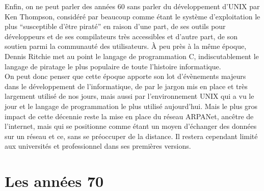 \documentclass[a4paper]{memoir}
\begin{document}
Enfin, on ne peut parler des années 60 sans parler du développement d'UNIX par Ken Thompson, considéré par beaucoup comme étant le système d'exploitation le plus ``susceptible d'être piraté'' en raison d'une part, de ses outils pour développeurs et de ses compilateurs très accessibles et d'autre part, de son soutien parmi la communauté des utilisateurs. À peu près à la même époque, Dennis Ritchie met au point le langage de programmation C, indiscutablement le langage de piratage le plus populaire de toute l'histoire informatique.\\

On peut donc penser que cette époque apporte son lot d'évènements majeurs dans le développement de l'informatique, de par le jargon mis en place et très largement utilisé de nos jours, mais aussi par l'environnement UNIX qui a vu le jour et le langage de programmation le plus utilisé aujourd'hui. Mais le plus gros impact de cette décennie reste la mise en place du réseau ARPANet, ancêtre de l'internet, mais qui se positionne comme étant un moyen d'échanger des données sur un réseau et ce, sans se préoccuper de la distance. Il restera cependant limité aux universités et professionnel dans ses premières versions.

\section{Les années 70}
\end{document}
